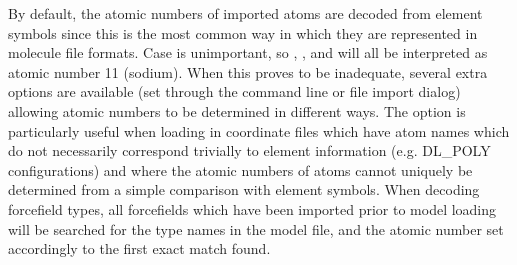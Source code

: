 By default, the atomic numbers of imported atoms are decoded from element symbols since this is the most common way in which they are represented in molecule file formats. Case is unimportant, so , , and  will all be interpreted as atomic number 11 (sodium). When this proves to be inadequate, several extra options are available (set through the command line or file import dialog) allowing atomic numbers to be determined in different ways. The  option is particularly useful when loading in coordinate files which have atom names which do not necessarily correspond trivially to element information (e.g. DL\_POLY configurations) and where the atomic numbers of atoms cannot uniquely be determined from a simple comparison with element symbols. When decoding forcefield types, all forcefields which have been imported prior to model loading will be searched for the type names in the model file, and the atomic number set accordingly to the first exact match found.



